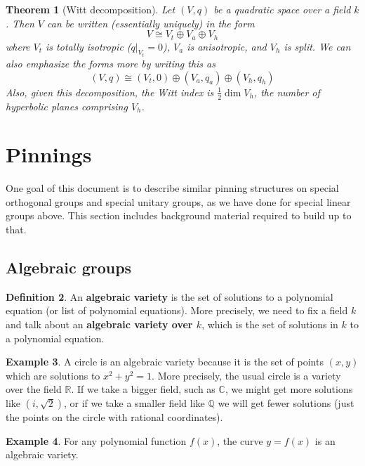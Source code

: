 \documentclass[12pt]{article}
\newtheorem{theorem}{Theorem}
\theoremstyle{definition}
\newtheorem{definition}[theorem]{Definition}
\newtheorem{example}[theorem]{Example}
\newcommand{\Q}{\mathbb{Q}}
\newcommand{\R}{\mathbb{R}}
\newcommand{\C}{\mathbb{C}}
\newcommand{\tbf}{\textbf}
\newcommand{\iso}{\cong}
\begin{document}
\begin{theorem}[Witt decomposition]
Let $(V,q)$ be a quadratic space over a field $k$. Then $V$ can be written (essentially uniquely) in the form
\[
	V \iso V_t \oplus V_a \oplus V_h
\]
where $V_t$ is totally isotropic ($q|_{V_t} = 0$), $V_a$ is anisotropic, and $V_h$ is split. We can also emphasize the forms more by writing this as
\[
	(V,q) \iso (V_t, 0) \oplus (V_a, q_a) \oplus (V_h, q_h)
\]
Also, given this decomposition, the Witt index is $\frac 12 \dim V_h$, the number of hyperbolic planes comprising $V_h$.
\end{theorem}

\newpage
\section{Pinnings}

One goal of this document is to describe similar pinning structures on special orthogonal groups and special unitary groups, as we have done for special linear groups above. This section includes background material required to build up to that.

\subsection{Algebraic groups}
\label{alg groups}


\begin{definition}
An \tbf{algebraic variety} is the set of solutions to a polynomial equation (or list of polynomial equations). More precisely, we need to fix a field $k$ and talk about an \tbf{algebraic variety over $k$}, which is the set of solutions in $k$ to a polynomial equation.
\end{definition}

\begin{example}
A circle is an algebraic variety because it is the set of points $(x,y)$ which are solutions to $x^2 + y^2 = 1$. More precisely, the usual circle is a variety over the field $\R$. If we take a bigger field, such as $\C$, we might get more solutions like $(i, \sqrt{2})$, or if we take a smaller field like $\Q$ we will get fewer solutions (just the points on the circle with rational coordinates).
\end{example}

\begin{example}
For any polynomial function $f(x)$, the curve $y = f(x)$ is an algebraic variety.
\end{example}
\end{document}
